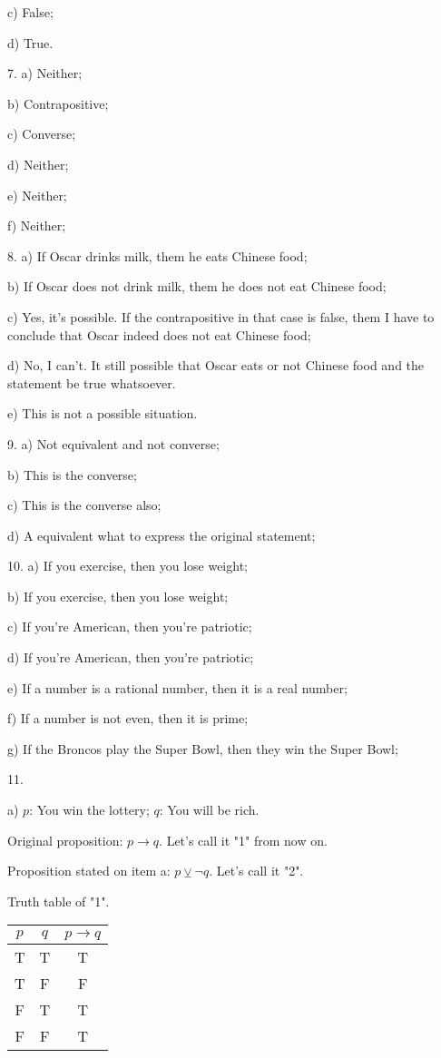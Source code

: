 \documentclass{article}
\begin{document}
  c) False;

  d) True.

  7. a) Neither;

  b) Contrapositive;

  c) Converse;

  d) Neither;

  e) Neither;

  f) Neither;

  8. a) If Oscar drinks milk, them he eats Chinese food;

  b) If Oscar does not drink milk, them he does not eat Chinese food;

  c) Yes, it's possible. If the contrapositive in that case is false, them I have to conclude that Oscar indeed does not eat Chinese food;

  d) No, I can't. It still possible that Oscar eats or not Chinese food and the statement be true whatsoever.

  e) This is not a possible situation.

  9. a) Not equivalent and not converse;

  b) This is the converse;

  c) This is the converse also;

  d) A equivalent what to express the original statement;

  10. a) If you exercise, then you lose weight;

  b) If you exercise, then you lose weight;

  c) If you're American, then you're patriotic;

  d) If you're American, then you're patriotic;

  e) If a number is a rational number, then it is a real number;

  f) If a number is not even, then it is prime;

  g) If the Broncos play the Super Bowl, then they win the Super Bowl;

  11. 


  a) $p$: You win the lottery; $q$: You will be rich.

  Original proposition: $p \rightarrow q$. Let's call it "1" from now on. 

  Proposition stated on item a: $p \veebar \neg q$. Let's call it "2".

  Truth table of "1".

  {
  \setlength{\tabcolsep}{10pt} %
  \renewcommand{\arraystretch}{1.5} %
  \begin{tabular}{|c|c|c|}
    \hline
    $p$ & $q$ & $p \rightarrow q$ \\
    \hline
    T & T & T \\
    T & F & F \\
    F & T & T \\
    F & F & T \\
    \hline
  \end{tabular}
  }
  
\end{document}
